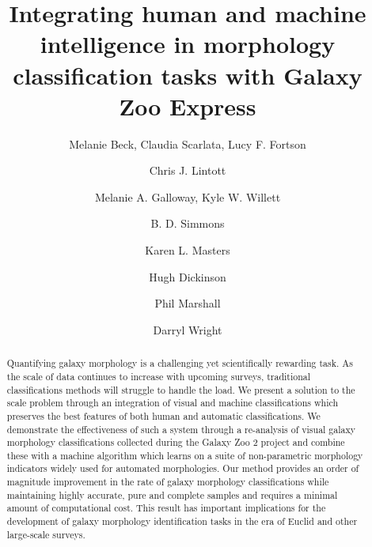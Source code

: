\documentclass[twocolumn]{aastex6}
\begin{document}
\title{Integrating human and machine intelligence in morphology classification tasks with Galaxy Zoo Express}


\author{Melanie Beck, Claudia Scarlata, Lucy F. Fortson}
\author{Chris J. Lintott}
\author{Melanie A. Galloway, Kyle W. Willett}
\author{B. D. Simmons}
\author{Karen L. Masters}
\author{Hugh Dickinson}
\author{Phil Marshall}
\author{Darryl Wright}



\begin{abstract}


Quantifying galaxy morphology is a challenging yet scientifically rewarding task. As the scale of data continues to increase with upcoming surveys, traditional classifications methods will struggle to handle the load. We present a solution to the scale problem through an integration of visual and machine classifications which preserves the best features of both human and automatic classifications. We demonstrate the effectiveness of such a system through a 
re-analysis of visual galaxy morphology classifications collected during the Galaxy Zoo 2
project and combine these with a machine algorithm which learns on a suite of non-parametric 
morphology indicators widely used for automated morphologies. Our method 
provides an order of magnitude improvement in the rate of galaxy morphology 
classifications while maintaining highly accurate, pure and complete samples and  
requires a minimal amount of computational cost. 
This result has important implications for the development of galaxy morphology identification tasks in the era of Euclid and other large-scale surveys. 


\end{abstract}
\end{document}
